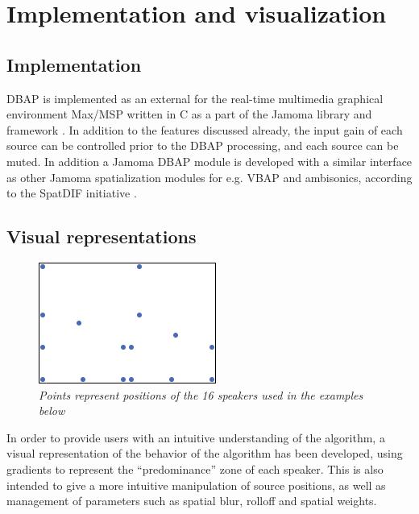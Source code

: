 \documentclass[twoside,10pt]{article}
\begin{document}
%
%

\section{Implementation and visualization}

\subsection{Implementation}

DBAP is implemented as an external for the real-time multimedia graphical environment Max/MSP \cite{Puckette:1988patcher, Zicarelli:1998} written in C as a part of the Jamoma library and framework \cite{Place:2006jamoma}. In addition to the features discussed already, the input gain of each source can be controlled prior to the DBAP processing, and each source can be muted.  In addition a Jamoma DBAP module is developed with a similar interface as other Jamoma spatialization modules for e.g. VBAP and ambisonics, according to the SpatDIF initiative \cite{Peters:2008spatdif}.



\subsection{Visual representations}
\label{sec:visual_representation}

\begin{figure}[ht]
\centerline{\includegraphics[scale=0.8]{LoudspeakerPositions}}
\caption{{\it Points represent positions of the 16 speakers used in the examples below}}
\label{speaker_positions}
\end{figure}

In order to provide users with an intuitive understanding of the algorithm, a visual representation of the behavior of the algorithm has been developed, using gradients to represent the ``predominance'' zone of each speaker. This is also intended to give a more intuitive manipulation of source positions, as well as management of parameters such as spatial blur, rolloff and spatial weights.
\end{document}
